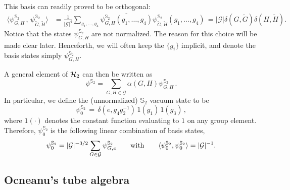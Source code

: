 \documentclass[nofootinbib,superscriptaddress,eqsecnum,tightenlines,11pt]{revtex4-1}
\def\nn{\nonumber}
\def\mG{\mathcal{G}}
\def\be{\begin{equation}}
\def\ee{\end{equation}}
\renewcommand{\S}{{\mathbb S}}
\begin{document}
This basis can readily proved to be orthogonal:
\begin{align} \nn
	\big\langle \psi^{\S_2}_{G,H}\, , \, \psi^{\S_2}_{\widetilde{G},\widetilde{H}}\big\rangle &= \frac{1}{|\mathcal{G}|^4}\sum_{g_1,\dots,g_4}\overline{\psi^{\S_2}_{G,H}(g_1,\dots,g_4)}\psi^{\S_2}_{\widetilde{G},\widetilde{H}}(g_1,\dots,g_4) %
	\,= |\mathcal{G}|\delta(G,\widetilde{G})\delta(H,\widetilde{H}). \label{innerprodgroup}
\end{align} 
Notice that the states $\psi^{\S_2}_{G,H}$ are not normalized.
The reason for this choice will be made clear later. Henceforth, we will often keep the $\{g_i\}$ implicit, and denote the basis states simply $\psi^{\S_2}_{G,H}$. 

A general element of ${\cal H}_2$ can then be written as
\be
\psi^{\S_2}= \sum_{G,H \in \mathcal{G}}\alpha(G,H) \psi_{G,H}^{\S_2}\,.
\ee
In particular, we define the (unnormalized) $\S_2$ vacuum state to be
\be
	\psi_0^{\S_2}\,=\, \delta(e, g_4 g^{-1}_2)  \, 1(g_1) \, 1(g_3)\, ,
	\label{vacuum}
\ee
where $1(\cdot)$ denotes the constant function evaluating to $1$ on any group element. 
Therefore, $\psi_0^{\S_2}$ is the following linear combination of basis states,
\be
\psi^{\S_2}_0 = |\mG|^{-3/2}\sum_{G\in\mG} \psi^{\S_2}_{G,e} 
\qquad\text{with}\qquad
\langle \psi^{\S_2}_0 , \psi^{\S_2}_0 \rangle =  |{\cal G}|^{-1}.
\ee


\subsection{Ocneanu's tube algebra \label{subsec_ocneanu}}
\end{document}
